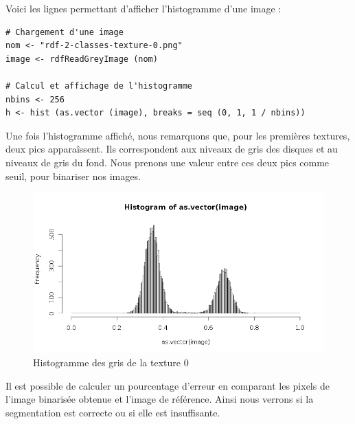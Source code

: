 \documentclass[11pt]{article}
\begin{document}
  \newpage
  
  Voici les lignes permettant d'afficher l'histogramme d'une image :
  
  \begin{lstlisting}[caption=Afficher l'histogramme d'une image]
# Chargement d'une image
nom <- "rdf-2-classes-texture-0.png"
image <- rdfReadGreyImage (nom)

# Calcul et affichage de l'histogramme
nbins <- 256
h <- hist (as.vector (image), breaks = seq (0, 1, 1 / nbins))\end{lstlisting}

  Une fois l'histogramme affiché, nous remarquons que, pour les premières textures, deux pics apparaîssent. 
  Ils correspondent aux niveaux de gris des disques et au niveaux de gris du fond. Nous prenons une valeur 
  entre ces deux pics comme seuil, pour binariser nos images.
  
  \begin{figure}[H]
    \center
    \includegraphics[width=14cm]{../elliot/gris0.png}
    \caption{Histogramme des gris de la texture 0}
  \end{figure}

  Il est possible de calculer un pourcentage d'erreur en comparant les pixels de l'image
  binarisée obtenue et l'image de référence. Ainsi nous verrons si la segmentation est correcte
  ou si elle est insuffisante.
  
\end{document}
